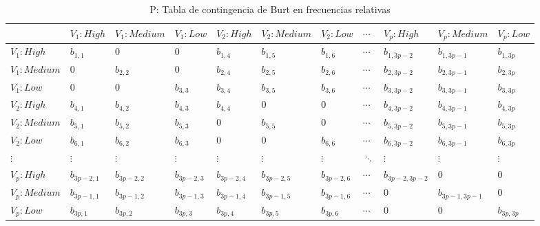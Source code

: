 \documentclass[mathematics,article,submit,moreauthors,pdftex]{mdpi}
\begin{document}
\begin{table}[!ht]
\begin{center}
 \begin{tabular}{| p{1.9cm} ||p{1cm}p{1cm}p{1cm}||p{1cm}p{1cm} p{1cm} ||p{1cm} ||p{1.3cm} p{1cm} p{1cm} ||} 
 \hline
  & $V_{1}:High$ &$V_{1}:Medium$ &$V_{1}:Low$ & $V_{2}:High$ & $V_{2}:Medium$ & $V_{2}:Low$ & $\cdots$ & $V_{p}:High$ & $V_{p}:Medium$ & $V_{p}:Low$ \\ [0.5ex] 
 \hline\hline
 $V_{1}:High$ & $b_{1,1}$ & 0 & 0  & $b_{1,4}$ & $b_{1,5}$ & $b_{1,6}$ & $\cdots$ & $b_{1,3p-2}$ & $b_{1,3p-1}$ & $b_{1,3p}$ \\
 $V_{1}:Medium$ & 0 & $b_{2,2}$ & 0 & $b_{2,4}$ & $b_{2,5}$ & $b_{2,6}$ & $\cdots$ & $b_{2,3p-2}$ & $b_{2,3p-1}$ & $b_{2,3p}$ \\ 
 $V_{1}:Low$ & 0 & 0 & $b_{3,3}$  & $b_{3,4}$ & $b_{3,5}$ & $b_{3,6}$ & $\cdots$ & $b_{3,3p-2}$ & $b_{3,3p-1}$ & $b_{3,3p}$ \\ 
\hline\hline
  $V_{2}:High$ & $b_{4,1}$ & $b_{4,2}$ & $b_{4,3}$ & $b_{4,4}$ & 0 & 0 & $\cdots$ & $b_{4,3p-2}$ & $b_{4,3p-1}$ & $b_{4,3p}$ \\
 $V_{2}:Medium$ & $b_{5,1}$ & $b_{5,2}$ & $b_{5,3}$ & 0 & $b_{5,5}$ & 0 & $\cdots$ & $b_{5,3p-2}$ & $b_{5,3p-1}$ & $b_{5,3p}$ \\ 
 $V_{2}:Low$ &  $b_{6,1}$ & $b_{6,2}$ & $b_{6,3}$ & 0 & 0 &  $b_{6,6}$ & $\cdots$& $b_{6,3p-2}$ & $b_{6,3p-1}$ & $b_{6,3p}$ \\ 
\hline\hline
 
 $\vdots$ & $\vdots$ & $\vdots$ & $\vdots$ & $\vdots$ & $\vdots$ & $\vdots$ & $\ddots$ & $\vdots$ & $\vdots$ & $\vdots$ \\ 
 
\hline\hline
 $V_{p}:High$  & $b_{3p-2,1}$   & $b_{3p-2,2}$   & $b_{3p-2,3}$   & $b_{3p-2,4}$   & $b_{3p-2,5}$   & $b_{3p-2,6}$    & $\cdots$ & $b_{3p-2,3p-2}$ & 0 & 0 \\
 $V_{p}:Medium$ & $b_{3p-1,1}$ & $b_{3p-1,2}$ & $b_{3p-1,3}$ & $b_{3p-1,4}$ & $b_{3p-1,5}$ & $b_{3p-1,6}$  & $\cdots$ & 0 & $b_{3p-1,3p-1}$ & 0 \\ 
 $V_{p}:Low$  & $b_{3p,1}$ & $b_{3p,2}$ & $b_{3p,3}$ & $b_{3p,4}$ & $b_{3p,5}$ & $b_{3p,6}$  & $\cdots$ & 0 & 0 & $b_{3p,3p}$ \\ 
\hline
\end{tabular}
\caption{P: Tabla de contingencia de Burt en frecuencias relativas}
\label{tab:p}
\end{center}
\end{table}
\end{document}
